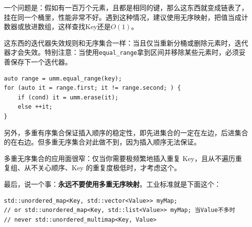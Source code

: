 一个问题是：假如有一百万个元素，且都是相同的键，那么这东西就变成链表了，挂在同一个桶里，性能非常不好。遇到这种情况，建议使用无序映射，把值当成计数器或放进数组，这样查找Key还是$O(1)$。

这东西的迭代器失效规则和无序集合一样：当且仅当重新分桶或删除元素时，迭代器才会失效。特别注意：当使用\verb|equal_range|拿到区间并移除某些元素时，必须妥善保存下一个迭代器。
\begin{verbatim}
auto range = umm.equal_range(key);
for (auto it = range.first; it != range.second; ) {
    if (cond) it = umm.erase(it); 
    else ++it;
}
\end{verbatim}

另外，多重有序集合保证插入顺序的稳定性，即先进集合的一定在左边，后进集合的在右边。但多重无序集合对此做不到，因为插入顺序无法保证。

多重无序集合的应用面很窄：仅当你需要极频繁地插入重复 Key，且从不遍历重复组、从不关心顺序、Key 的重复度极低时，才考虑这个。

最后，说一个事：\textbf{永远不要使用多重无序映射}。工业标准就是下面这个：
\begin{verbatim}
std::unordered_map<Key, std::vector<Value>> myMap;
// or std::unordered_map<Key, std::list<Value>> myMap; 当Value不多时
// never std::unordered_multimap<Key, Value>
\end{verbatim}
